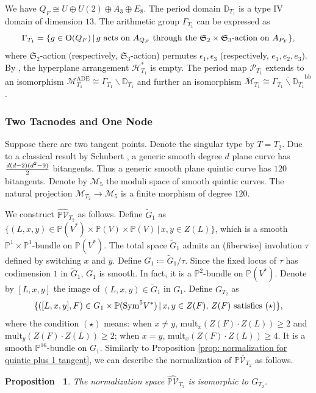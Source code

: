 \documentclass[12pt,reqno,a4paper]{amsart}
\newtheorem{prop}[thm]{Proposition~}
\theoremstyle{remark}
\theoremstyle{definition}
\begin{document}
We have $Q_F\cong U\oplus U(2)\oplus A_3\oplus E_8$.
The period domain $\mathbb{D}_{T_1}$ is a type IV domain of dimension $13$.
The arithmetic group $\Gamma_{T_1}$ can be expressed as
\begin{equation*}
    \Gamma_{T_1} = \{ g\in\mathrm{O}(Q_F) \,|\, g \textup{ acts on } A_{Q_F} \textup{ through the } \mathfrak{S}_2\times\mathfrak{S}_3\textup{-action on } A_{P_F} \},
\end{equation*}
where $\mathfrak{S}_2$-action (respectively, $\mathfrak{S}_3$-action) permutes $\epsilon_1,\epsilon_3$ (respectively, $e_1,e_2,e_3$).
By \cite[Proposition 3.7]{yu2023moduli}, the hyperplane arrangement $\mathcal{H}_{T_1}^*$ is empty.
The period map $\mathscr{P}_{T_1}$ extends to an isomorphism $\mathcal{M}_{T_1}^{\mathrm{ADE}}\cong\Gamma_{T_1}\backslash\mathbb{D}_{T_1}$ and further an isomorphism $\overline{\mathcal{M}}_{T_1}\cong \overline{\Gamma_{T_1}\backslash\mathbb{D}_{T_1}}^{\mathrm{bb}}$.




\subsubsection{Two Tacnodes and One Node}

Suppose there are two tangent points. Denote the singular type by $T=T_2$.
Due to a classical result by Schubert \cite{schubert1879kalkul}, a generic smooth degree $d$ plane curve has $d(d-2)(d^2-9)\over2$ bitangents.
Thus a generic smooth plane quintic curve has $120$ bitangents.
Denote by $\mathcal{M}_5$ the moduli space of smooth quintic curves.
The natural projection $\mathcal{M}_{T_2}\to \mathcal{M}_5$ is a finite morphism of degree $120$.

We construct $\widehat{\mathbb{P}\mathcal{V}}_{T_2}$ as follows.
Define $\widetilde{G}_1$ as $\{ (L,x,y)\in\mathbb{P}(V^*)\times\mathbb{P}(V)\times\mathbb{P}(V) \,|\, x,y\in Z(L) \}$, which is a smooth $\mathbb{P}^1\times\mathbb{P}^1$-bundle on $\mathbb{P}(V^*)$.
The total space $\widetilde{G}_1$ admits an (fiberwise) involution $\tau$ defined by switching $x$ and $y$.
Define $G_1\coloneqq \widetilde{G}_1/\tau$. Since the fixed locus of $\tau$ has codimension $1$ in $\widetilde{G}_1$, $G_1$ is smooth. In fact, it is a $\mathbb{P}^2$-bundle on $\mathbb{P}(V^*)$. Denote by $[L,x,y]$ the image of $(L,x,y)\in\widetilde{G}_1$ in $G_1$.
Define $G_{T_2}$ as 
\begin{equation*}
    \{ ([L,x,y],F)\in G_1\times\mathbb{P}(\mathrm{Sym}^5 V^*) \,|\, x,y\in Z(F),\, Z(F)\textup{ satisfies }(\star) \},
\end{equation*}
where the condition $(\star)$ means: when $x\ne y$, $\mathrm{mult}_x (Z(F)\cdot Z(L))\ge 2$ and $\mathrm{mult}_y (Z(F)\cdot Z(L))\ge 2$; when $x=y$, $\mathrm{mult}_x(Z(F)\cdot Z(L))\ge 4$. 
It is a smooth $\mathbb{P}^{16}$-bundle on $G_1$. Similarly to Proposition \ref{prop: normalization for quintic plus 1 tangent}, we can describe the normalization of $\mathbb{P}\overline{\mathcal{V}}_{T_2}$ as follows.
\begin{prop}
    The normalization space $\widehat{\mathbb{P}\mathcal{V}}_{T_2}$ is isomorphic to $G_{T_2}$.
\end{prop}
\end{document}
